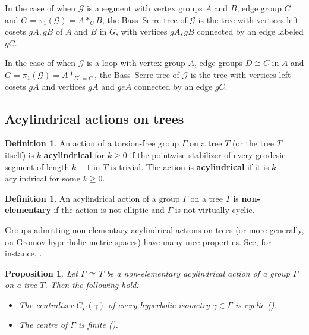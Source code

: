 \documentclass{amsart}
\theoremstyle{plain}
\newtheorem{prop}[thm]{Proposition}
\theoremstyle{definition}
\newtheorem{defn}[thm]{Definition}
\theoremstyle{remark}
\begin{document}
In the case of when $\mathcal{G}$ is a segment with vertex groups $A$ and $B$, edge group $C$ and $G=\pi_1(\mathcal{G}) = A *_C B$, the Bass--Serre tree of $\mathcal{G}$ is the tree with vertices left cosets $gA, gB$ of $A$ and $B$ in $G$, with vertices $gA, gB$ connected by an edge labeled $gC$. 

In the case of when $\mathcal{G}$ is a loop with vertex group $A$, edge groups $D \cong C$ in $A$ and $G=\pi_1(\mathcal{G}) = A *_{D^e = C}$, the Bass--Serre tree of $\mathcal{G}$ is the tree with vertices left cosets $gA$ and vertices $gA$ and $geA$ connected by an edge $gC$. 

\subsection{Acylindrical actions on trees}

\begin{defn}
    \label{defn: acylindrical action on a tree}
    An action of a torsion-free group $\Gamma$ on a tree $T$ (or the tree $T$ itself) is $k$-\textbf{acylindrical} for $k \geq 0$ if the pointwise stabilizer of every geodesic segment of length $k+1$ in $T$ is trivial. The action is \textbf{acylindrical} if it is $k$-acylindrical for some $k \geq 0$. 
\end{defn}

\begin{defn}
    \label{defn: non-elementary acylindrical}
    An acylindrical action of a group $\Gamma$ on a tree $T$ is \textbf{non-elementary} if the action is not elliptic and $\Gamma$ is not virtually cyclic. 
\end{defn}

Groups admitting non-elementary acylindrical actions on trees (or more generally, on Gromov hyperbolic metric spaces) have many nice properties. See, for instance, \cite{OsinAH_Groups}. 

\begin{prop}
    \label{prop: properties of groups acting acylindrically on trees}
    Let $\Gamma \curvearrowright T$ be a non-elementary acylindrical action of a group $\Gamma$ on a tree $T$. Then the following hold: 

    \begin{itemize}
        \item The centralizer $C_{\Gamma}(\gamma)$ of every hyperbolic isometry $\gamma \in \Gamma$ is cyclic (\cite[Corollary 6.9]{OsinAH_Groups}). 
        \item The centre of $\Gamma$ is finite (\cite[Corollary 7.2]{OsinAH_Groups}).
    \end{itemize}
\end{prop}
\end{document}
